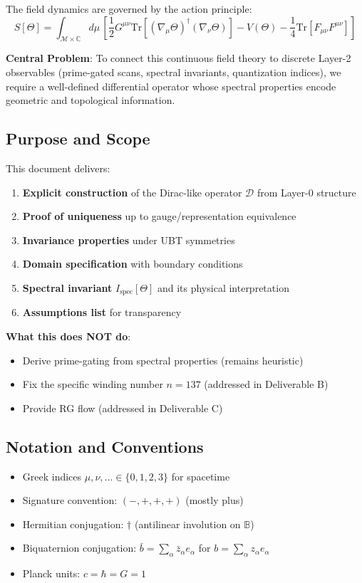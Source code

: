 \documentclass[12pt]{article}
\newcommand{\B}{\mathbb{B}}
\newcommand{\C}{\mathbb{C}}
\newcommand{\M}{\mathcal{M}}
\newcommand{\Tr}{\mathrm{Tr}}
\begin{document}
The field dynamics are governed by the action principle:
\begin{equation}
S[\Theta] = \int_{\M \times \C} d\mu \, \left[ \frac{1}{2} G^{\mu\nu} \Tr[(\nabla_\mu \Theta)^\dagger (\nabla_\nu \Theta)] - V(\Theta) - \frac{1}{4}\Tr[F_{\mu\nu} F^{\mu\nu}] \right]
\label{eq:action}
\end{equation}

\textbf{Central Problem}: To connect this continuous field theory to discrete Layer-2 observables (prime-gated scans, spectral invariants, quantization indices), we require a well-defined differential operator whose spectral properties encode geometric and topological information.

\subsection{Purpose and Scope}

This document delivers:
\begin{enumerate}
    \item \textbf{Explicit construction} of the Dirac-like operator $\mathcal{D}$ from Layer-0 structure
    \item \textbf{Proof of uniqueness} up to gauge/representation equivalence
    \item \textbf{Invariance properties} under UBT symmetries
    \item \textbf{Domain specification} with boundary conditions
    \item \textbf{Spectral invariant} $I_{\text{spec}}[\Theta]$ and its physical interpretation
    \item \textbf{Assumptions list} for transparency
\end{enumerate}

\textbf{What this does NOT do}:
\begin{itemize}
    \item Derive prime-gating from spectral properties (remains heuristic)
    \item Fix the specific winding number $n=137$ (addressed in Deliverable B)
    \item Provide RG flow (addressed in Deliverable C)
\end{itemize}

\subsection{Notation and Conventions}

\begin{itemize}
    \item Greek indices $\mu, \nu, \ldots \in \{0,1,2,3\}$ for spacetime
    \item Signature convention: $(-,+,+,+)$ (mostly plus)
    \item Hermitian conjugation: $\dagger$ (antilinear involution on $\B$)
    \item Biquaternion conjugation: $\bar{b} = \sum_\alpha \bar{z}_\alpha e_\alpha$ for $b = \sum_\alpha z_\alpha e_\alpha$
    \item Planck units: $c = \hbar = G = 1$
\end{itemize}
\end{document}
